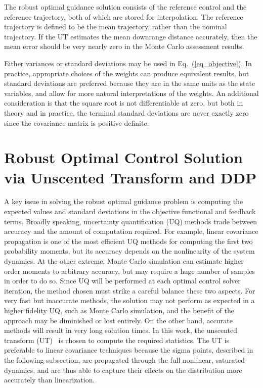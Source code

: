 \documentclass[journal ]{new-aiaa}
\begin{document}
The robust optimal guidance solution consists of the reference control and the reference trajectory, both of which are stored for interpolation. The reference trajectory is defined to be the mean trajectory, rather than the nominal trajectory. If the UT estimates the mean downrange distance accurately, then the mean error should be very nearly zero in the Monte Carlo assessment results. 

Either variances or standard deviations may be used in Eq.~(\ref{eq_objective}). In practice, appropriate choices of the weights can produce equivalent results, but standard deviations are preferred because they are in the same units as the state variables, and allow for more natural interpretations of the weights. An additional consideration is that the square root is not differentiable at zero, but both in theory and in practice, the terminal standard deviations are never exactly zero since the covariance matrix is positive definite.

\section*{Robust Optimal Control Solution via Unscented Transform and DDP}
A key issue in solving the robust optimal guidance problem is computing the expected values and standard deviations in the objective functional and feedback terms. Broadly speaking, uncertainty quantification (UQ) methods trade between accuracy and the amount of computation required. For example, linear covariance propagation is one of the most efficient UQ methods for computing the first two probability moments, but its accuracy depends on the nonlinearity of the system dynamics. At the other extreme, Monte Carlo simulation can estimate higher order moments to arbitrary accuracy, but may require a huge number of samples in order to do so. Since UQ will be performed at each optimal control solver iteration, the method chosen must strike a careful balance these two aspects. For very fast but inaccurate methods, the solution may not perform as expected in a higher fidelity UQ, such as Monte Carlo simulation, and the benefit of the approach may be diminished or lost entirely. On the other hand, accurate methods will result in very long solution times. In this work, the unscented transform (UT)~\cite{UT1997} is chosen to compute the required statistics. The UT is preferable to linear covariance techniques because the sigma points, described in the following subsection, are propagated through the full nonlinear, saturated dynamics, and are thus able to capture their effects on the distribution more accurately than linearization. 
\end{document}
